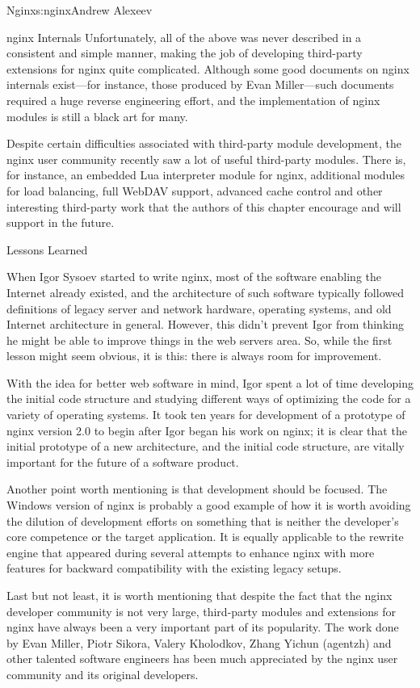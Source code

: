 \begin{aosachapter}{Nginx}{s:nginx}{Andrew Alexeev}
\begin{aosasect1}{nginx Internals}
Unfortunately, all of the above was never described in a consistent and
simple manner, making the job of developing third-party extensions for
nginx quite complicated. Although some good documents on nginx
internals exist---for instance, those produced by Evan Miller---such
documents required a huge reverse engineering effort, and the
implementation of nginx modules is still a black art for many.

Despite certain difficulties associated with third-party module
development, the nginx user community recently saw a lot of useful
third-party modules. There is, for instance, an embedded Lua
interpreter module for nginx, additional modules for load balancing,
full WebDAV support, advanced cache control and other interesting
third-party work that the authors of this chapter encourage and will
support in the future.

\end{aosasect1}

\begin{aosasect1}{Lessons Learned}

When Igor Sysoev started to write nginx, most of the software enabling
the Internet already existed, and the architecture of such software
typically followed definitions of legacy server and network hardware,
operating systems, and old Internet architecture in general. However,
this didn't prevent Igor from thinking he might be able to improve
things in the web servers area. So, while the first lesson might seem
obvious, it is this: there is always room for improvement.

With the idea for better web software in mind, Igor spent
a lot of time developing the initial code structure and studying
different ways of optimizing the code for a variety of operating
systems. It took ten years for development of a prototype of nginx version
2.0 to begin after Igor began his work on nginx; it is clear that the
initial prototype of a new architecture, and the initial code
structure, are vitally important for the future of a software product.

Another point worth mentioning is that development should be
focused. The Windows version of nginx is probably a good example of
how it is worth avoiding the dilution of development efforts on
something that is neither the developer's core competence or the
target application. It is equally applicable to the rewrite engine
that appeared during several attempts to enhance nginx with more
features for backward compatibility with the existing legacy setups.

Last but not least, it is worth mentioning that despite the fact that
the nginx developer community is not very large, third-party modules
and extensions for nginx have always been a very important part of its
popularity. The work done by Evan Miller, Piotr Sikora, Valery
Kholodkov, Zhang Yichun (agentzh) and other talented software
engineers has been much appreciated by the nginx user community and
its original developers.

\end{aosasect1}

\end{aosachapter}
